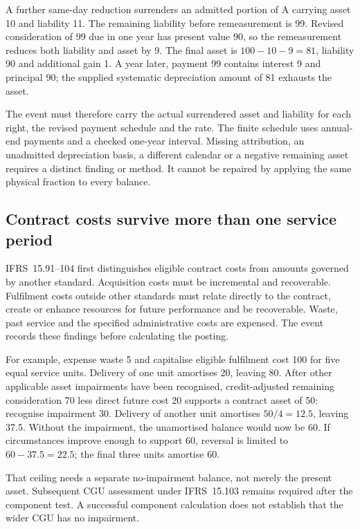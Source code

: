 A further same-day reduction surrenders an admitted portion of A carrying
asset 10 and liability 11. The remaining liability before remeasurement is
99. Revised consideration of 99 due in one year has present value 90, so the
remeasurement reduces both liability and asset by 9. The final asset is
\(100-10-9=81\), liability 90 and additional gain 1. A year later, payment 99
contains interest 9 and principal 90; the supplied systematic depreciation
amount of 81 exhausts the asset.

The event must therefore carry the actual surrendered asset and liability for
each right, the revised payment schedule and the rate. The finite schedule
uses annual-end payments and a checked one-year interval. Missing attribution,
an unadmitted depreciation basis, a different calendar or a negative remaining
asset requires a distinct finding or method. It cannot be repaired by applying
the same physical fraction to every balance.

\subsection{Contract costs survive more than one service period}

IFRS~15.91--104 first distinguishes eligible contract costs from amounts governed
by another standard. Acquisition costs must be incremental and recoverable.
Fulfilment costs outside other standards must relate directly to the contract,
create or enhance resources for future performance and be recoverable. Waste,
past service and the specified administrative costs are expensed. The event
records these findings before calculating the posting.

For example, expense waste 5 and capitalise eligible fulfilment cost 100 for
five equal service units. Delivery of one unit amortises 20, leaving 80. After
other applicable asset impairments have been recognised, credit-adjusted
remaining consideration 70 less direct future cost 20 supports a contract
asset of 50: recognise impairment 30. Delivery of another unit amortises
\(50/4=12.5\), leaving 37.5. Without the impairment, the unamortised balance
would now be 60. If circumstances improve enough to support 60, reversal is
limited to \(60-37.5=22.5\); the final three units amortise 60.

That ceiling needs a separate no-impairment balance, not merely the present
asset. Subsequent CGU assessment under IFRS~15.103 remains required after the
component test. A successful component calculation does not establish that
the wider CGU has no impairment.

